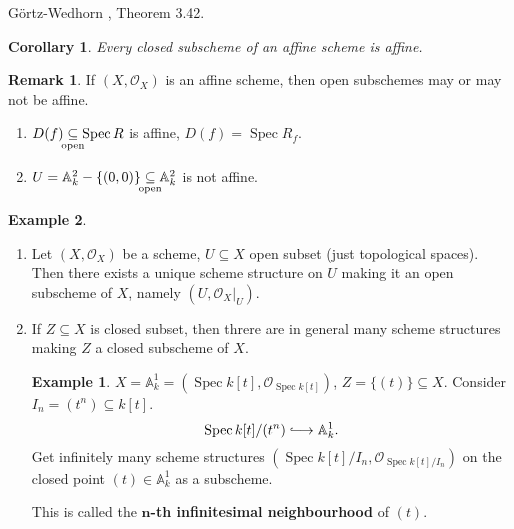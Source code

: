 \documentclass[12pt]{article}
\DeclareMathOperator{\Spec}{Spec}
\newtheorem*{corollary}{Corollary}
\theoremstyle{definition}
\newtheorem*{remark}{Remark}
\newtheorem*{example}{Example}
\begin{document}
G\"ortz-Wedhorn \cite{gortz2010algebraic}, Theorem 3.42.

\begin{corollary}
Every closed subscheme of an affine scheme is affine.
\end{corollary}

\begin{remark}
If $(X,\mathcal O_X)$ is an affine scheme, then open subschemes may or may not be affine.

\begin{enumerate}[label=\arabic*)]
\item $D(f)\underset{\mathclap{\text{open}}}\subseteq\Spec R$ is affine, $D(f)=\Spec R_f$.

\item $U=\mathbb A_k^2-\{(0,0)\}\underset{\mathclap{\text{open}}}\subseteq\mathbb A_k^2$ is not affine.
\end{enumerate}
\end{remark}

\begin{example}
\begin{enumerate}[label=\arabic*)]
\item Let $(X,\mathcal O_X)$ be a scheme, $U\subseteq X$ open subset (just topological spaces). Then there exists a unique scheme structure on $U$ making it an open subscheme of $X$, namely $(U,\mathcal O_X|_U)$.

\item If $Z\subseteq X$ is closed subset, then threre are in general many scheme structures making $Z$ a closed subscheme of $X$.
\begin{example}
$X=\mathbb A_k^1=(\Spec k[t],\mathcal O_{\Spec k[t]})$, $Z=\{(t)\}\subseteq X$. Consider $I_n=(t^n)\subseteq k[t]$.
\[\Spec k[t]/(t^n)\lhook\joinrel\longrightarrow\mathbb A_k^1.\]
Get infinitely many scheme structures $(\Spec k[t]/I_n,\mathcal O_{\Spec k[t]/I_n})$ on the closed point $(t)\in\mathbb A_k^1$ as a subscheme.

This is called the \textbf{$\boldsymbol n$-th infinitesimal neighbourhood} of $(t)$.
\end{example}
\end{enumerate}
\end{example}
\end{document}
